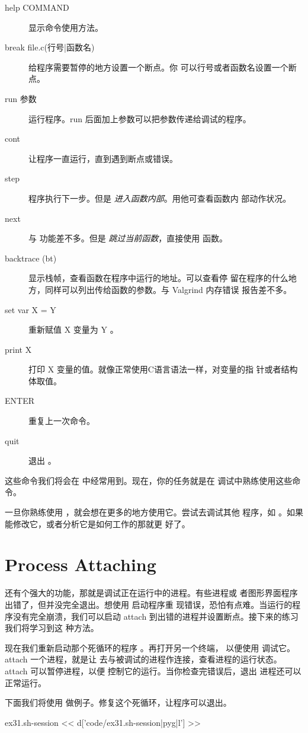 \begin{enumerate}
\begin{description}
\item[help COMMAND] 显示命令使用方法。
\item[break file.c(行号|函数名)] 给程序需要暂停的地方设置一个断点。你
  可以行号或者函数名设置一个断点。
\item[run 参数] 运行程序。run 后面加上参数可以把参数传递给调试的程序。
\item[cont] 让程序一直运行，直到遇到断点或错误。
\item[step] 程序执行下一步。但是 \emph{进入函数内部}。用他可查看函数内
  部动作状况。
\item[next] 与  功能差不多。但是 \emph{跳过当前函数}，直接使用
  函数。
\item[backtrace (bt)] 显示栈帧，查看函数在程序中运行的地址。可以查看停
  留在程序的什么地方，同样可以列出传给函数的参数。与 Valgrind 内存错误
  报告差不多。
\item[set var X = Y] 重新赋值 X 变量为 Y 。
\item[print X] 打印 X 变量的值。就像正常使用C语言语法一样，对变量的指
  针或者结构体取值。
\item[ENTER] 重复上一次命令。
\item[quit] 退出 。
\end{description}


这些命令我们将会在  中经常用到。现在，你的任务就是在
 调试中熟练使用这些命令。


一旦你熟练使用 ，就会想在更多的地方使用它。尝试去调试其他
程序，如 。如果能修改它，或者分析它是如何工作的那就更
好了。

\section{Process Attaching}

 还有个强大的功能，那就是调试正在运行中的进程。有些进程或
者图形界面程序出错了，但并没完全退出。想使用  启动程序重
现错误，恐怕有点难。当运行的程序没有完全崩溃，我们可以启动
 attach 到出错的进程并设置断点。接下来的练习我们将学习到这
种方法。

现在我们重新启动那个死循环的程序 。再打开另一个终端，
以便使用  调试它。attach 一个进程，就是让 
去与被调试的进程作连接，查看进程的运行状态。attach 可以暂停进程，以便
控制它的运行。当你检查完错误后，退出  进程还可以正常运行。

下面我们将使用  做例子。修复这个死循环，让程序可以退出。
\begin{code}{ex31.sh-session}
<< d['code/ex31.sh-session|pyg|l'] >>
\end{code}


\end{enumerate}
